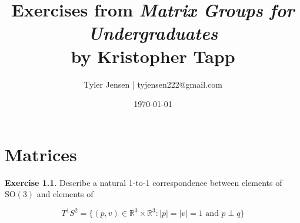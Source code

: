 \documentclass[12pt]{book}
\title{Exercises from \textit{Matrix Groups for Undergraduates} \\
       by Kristopher Tapp}
\author{Tyler Jensen | tyjensen222@gmail.com}
\date{\today}
\theoremstyle{definition}
\newtheorem{exercise}{Exercise}[chapter]
\begin{document}
\newcommand{\R}{\mathbb{R}}        %
\newcommand{\C}{\mathbb{C}}        %
\newcommand{\Q}{\mathbb{Q}}        %
\newcommand{\Z}{\mathbb{Z}}        %
\newcommand{\N}{\mathbb{N}}        %

\newcommand{\GL}[2]{\mathrm{GL}_{#1}(#2)}   %
\newcommand{\SL}[2]{\mathrm{SL}_{#1}(#2)}   %

\newcommand{\Ogroup}[1]{\mathrm{O}(#1)}     %
\newcommand{\SO}[1]{\mathrm{SO}(#1)}        %
\newcommand{\Sp}[1]{\mathrm{Sp}(#1)}        %

\newcommand{\U}[1]{\mathrm{U}(#1)}          %
\newcommand{\SU}[1]{\mathrm{SU}(#1)}        %

\newcommand{\lie}[1]{\mathfrak{#1}}         %
\newcommand{\so}[1]{\mathfrak{so}_{#1}}     %
\newcommand{\sualg}[1]{\mathfrak{su}_{#1}}  %
\newcommand{\glalg}[1]{\mathfrak{gl}_{#1}}  %
\newcommand{\slalg}[1]{\mathfrak{sl}_{#1}}  %
\newcommand{\spalg}[1]{\mathfrak{sp}_{#1}}  %

\newcommand{\g}{\mathfrak{g}}
\newcommand{\G}{\mathrm{G}}


\frontmatter
\maketitle
\tableofcontents

\mainmatter

\chapter{Matrices}

\begin{exercise}
Describe a natural 1-to-1 correspondence between elements of $\SO{3}$ and elements of

\[
T^1S^2 = \{ (p, v) \in \R^3 \times \R^3 : |p| = |v| = 1 \text{ and } p \perp q\}
\]

\end{exercise}
\end{document}
